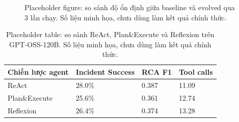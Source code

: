 \begin{figure}[htbp]
\centering
{}
\caption{Placeholder figure: so sánh độ ổn định giữa baseline và evolved qua 3 lần chạy. Số liệu minh họa, chưa dùng làm kết quả chính thức.}
\label{fig:stability_placeholder}
\end{figure}

\begin{table}[htbp]
\centering
\caption{Placeholder table: so sánh ReAct, Plan\&Execute và Reflexion trên GPT-OSS-120B. Số liệu minh họa, chưa dùng làm kết quả chính thức.}
\label{tab:agent_strategy_placeholder}
\begin{tabular}{|L{3.2cm}|C{2.2cm}|C{2.2cm}|C{2.2cm}|}
\hline
\textbf{Chiến lược agent} & \textbf{Incident Success} & \textbf{RCA F1} & \textbf{Tool calls} \\
\hline
ReAct & 28.0\% & 0.387 & 11.09 \\
\hline
Plan\&Execute & 25.6\% & 0.361 & 12.74 \\
\hline
Reflexion & 26.4\% & 0.374 & 13.28 \\
\hline
\end{tabular}
\end{table}

